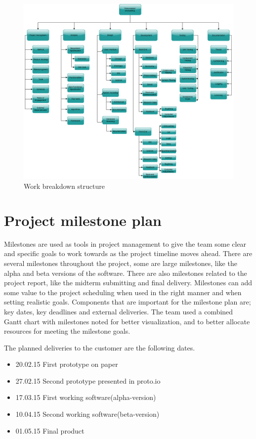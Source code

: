 \begin{figure}[h!]
	\centering
	\includegraphics[width=\textwidth]{fig/wbs}
	\caption{Work breakdown structure}
	\label{Fig:wbs}
\end{figure}

\section{Project milestone plan}
\label{sec:milestone_plan}

Milestones are used as tools in project management to give the team some clear and specific goals to work towards as the project timeline moves ahead. There are several milestones throughout the project, some are large milestones, like the alpha and beta versions of the software. There are also milestones related to the project report, like the midterm submitting and final delivery. Milestones can add some value to the project scheduling when used in the right manner and when setting realistic goals. Components that are important for the milestone plan are; key dates, key deadlines and external deliveries. The team used a combined Gantt chart with milestones noted for better visualization, and to better allocate resources for meeting the milestone goals.\newline

The planned deliveries to the customer are the following dates. 
\begin{itemize}
\item 20.02.15 First prototype on paper
\item 27.02.15 Second prototype presented in proto.io \cite{protoIO}
\item 17.03.15 First working software(alpha-version)
\item 10.04.15 Second working software(beta-version) 
\item 01.05.15 Final product
\end{itemize}

